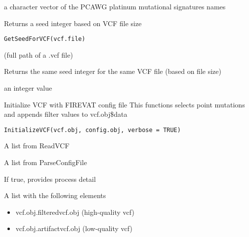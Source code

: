 \documentclass[letterpaper]{book}
\begin{document}
%
\begin{Value}
a character vector of the PCAWG platinum mutational signatures names
\end{Value}
%
\begin{Description}\relax
Returns a seed integer based on VCF file size
\end{Description}
%
\begin{Usage}
\begin{verbatim}
GetSeedForVCF(vcf.file)
\end{verbatim}
\end{Usage}
%
\begin{Arguments}
\begin{ldescription}
\item[\code{vcf.file}] (full path of a .vcf file)
\end{ldescription}
\end{Arguments}
%
\begin{Details}\relax
Returns the same seed integer for the same VCF file (based on file size)
\end{Details}
%
\begin{Value}
an integer value
\end{Value}
%
\begin{Description}\relax
Initialize VCF with FIREVAT config file
This functions selects point mutations and
appends filter values to vcf.obj\$data
\end{Description}
%
\begin{Usage}
\begin{verbatim}
InitializeVCF(vcf.obj, config.obj, verbose = TRUE)
\end{verbatim}
\end{Usage}
%
\begin{Arguments}
\begin{ldescription}
\item[\code{vcf.obj}] A list from ReadVCF

\item[\code{config.obj}] A list from ParseConfigFile

\item[\code{verbose}] If true, provides process detail
\end{ldescription}
\end{Arguments}
%
\begin{Value}
A list with the following elements
\begin{itemize}

\item{} vcf.obj.filteredvcf.obj (high-quality vcf)
\item{} vcf.obj.artifactvcf.obj (low-quality vcf)

\end{itemize}

\end{Value}
\end{document}
